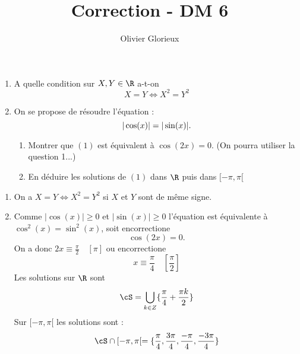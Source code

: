 \documentclass[a4paper, 11pt,reqno]{article}
\author{Olivier Glorieux}
\begin{document}
\title{Correction - DM 6
}

\begin{exercice}
\begin{enumerate}
\item A quelle condition sur $X,Y\in \R$ a-t-on 
$$X=Y \Longleftrightarrow X^2=Y^2  $$

\item On se propose de résoudre l'équation :
\begin{equation}
|\cos(x)|=|\sin(x)|.\\
\end{equation}
\begin{enumerate}
\item Montrer que $(1)$ est équivalent à $\cos(2x)=0$.  (On pourra utiliser la question 1...)
\item En déduire les solutions  de $(1)$ dans $\R$ puis dans $[-\pi, \pi[$ 
\end{enumerate}

\end{enumerate}
\end{exercice}


\begin{correction}
\begin{enumerate}
\item On a  $X=Y \Longleftrightarrow X^2=Y^2  $ si $X$ et $Y$ sont de même signe.
\item Comme $|\cos(x)|\geq 0$ et $|\sin(x)|\geq 0$ l'équation est équivalente à $\cos^2(x) =\sin^2(x)$, soit encorrectione 
$$\cos(2x)=0.$$
On a donc $2x\equiv \frac{\pi}{2}\quad [\pi]$ ou encorrectione 
$$x\equiv \frac{\pi}{4}\quad [\frac{\pi}{2}]$$
 Les solutions sur $\R$ sont 
 $$\cS =\bigcup_{k\in Z} \{ \frac{\pi}{4}+\frac{\pi k}{2}\}$$
 Sur $[-\pi, \pi[$  les solutions sont :
 $$\cS\cap [-\pi, \pi[ =  \{ \frac{\pi}{4}, \frac{3\pi}{4}, \frac{-\pi}{4}, \frac{-3\pi}{4}\}$$
 




\end{enumerate}
\end{correction}
\end{document}
